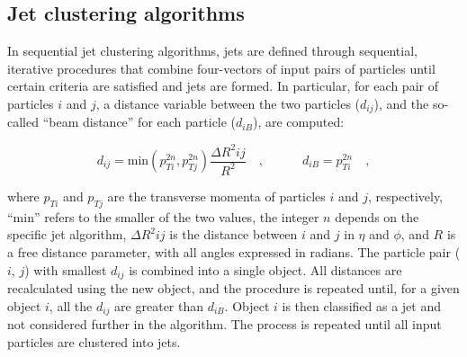 \subsection{Jet clustering algorithms}\label{subsec:jetsalgo}

In sequential jet clustering algorithms, jets are defined through sequential, iterative procedures that combine four-vectors of input pairs of particles until certain criteria are satisfied and jets are formed. In particular, for each pair of particles $i$ and $j$, a distance variable between the two particles ($d_{ij}$), and the so-called ``beam distance'' for each particle ($d_{iB}$), are computed:
 
\begin{equation}
d_{ij} = \mathrm{min}(p_{Ti}^{2n},p_{Tj}^{2n})\frac{\Delta R^2{ij}}{R^2}\quad,\quad\quad\quad
d_{iB} = p_{Ti}^{2n}\quad,
\end{equation} 

where $p_{Ti}$ and $p_{Tj}$ are the transverse momenta of particles $i$ and $j$, respectively, ``min'' refers to the smaller of the two \pt values, the integer $n$ depends on the specific jet algorithm, $\Delta R^2{ij}$ is the distance between $i$ and $j$ in $\eta$ and $\phi$, and $R$ is a free distance parameter, with all angles expressed in radians. The particle pair ($i$, $j$) with smallest $d_{ij}$ is combined into a single object. All distances are recalculated using the new object, and the procedure is repeated until, for a given object $i$, all the $d_{ij}$ are greater than $d_{iB}$. Object $i$ is then classified as a jet and not considered further in the algorithm. The process is repeated until all input particles are clustered into jets.

